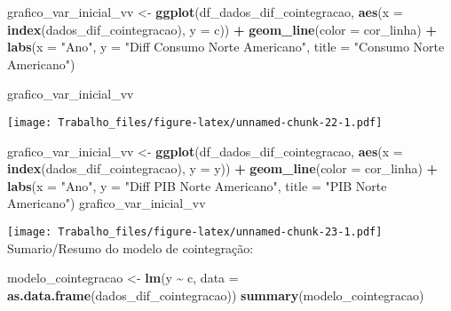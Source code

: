 \documentclass[
]{article}
\newenvironment{Shaded}{\begin{snugshade}}{\end{snugshade}}
\newcommand{\AttributeTok}[1]{\textcolor[rgb]{0.13,0.29,0.53}{#1}}
\newcommand{\FunctionTok}[1]{\textcolor[rgb]{0.13,0.29,0.53}{\textbf{#1}}}
\newcommand{\NormalTok}[1]{#1}
\newcommand{\OtherTok}[1]{\textcolor[rgb]{0.56,0.35,0.01}{#1}}
\newcommand{\SpecialCharTok}[1]{\textcolor[rgb]{0.81,0.36,0.00}{\textbf{#1}}}
\newcommand{\StringTok}[1]{\textcolor[rgb]{0.31,0.60,0.02}{#1}}
\begin{document}
\begin{Shaded}
\begin{Highlighting}[]
\NormalTok{grafico\_var\_inicial\_vv }\OtherTok{\textless{}{-}} \FunctionTok{ggplot}\NormalTok{(df\_dados\_dif\_cointegracao, }\FunctionTok{aes}\NormalTok{(}\AttributeTok{x =} \FunctionTok{index}\NormalTok{(dados\_dif\_cointegracao), }\AttributeTok{y =}\NormalTok{ c)) }\SpecialCharTok{+}
  \FunctionTok{geom\_line}\NormalTok{(}\AttributeTok{color =}\NormalTok{ cor\_linha) }\SpecialCharTok{+}
  \FunctionTok{labs}\NormalTok{(}\AttributeTok{x =} \StringTok{"Ano"}\NormalTok{, }\AttributeTok{y =} \StringTok{"Diff Consumo Norte Americano"}\NormalTok{, }\AttributeTok{title =} \StringTok{"Consumo Norte Americano"}\NormalTok{)}

\NormalTok{grafico\_var\_inicial\_vv}
\end{Highlighting}
\end{Shaded}

\texttt{[image: Trabalho\_files/figure-latex/unnamed-chunk-22-1.pdf]}

\begin{Shaded}
\begin{Highlighting}[]
\NormalTok{grafico\_var\_inicial\_vv }\OtherTok{\textless{}{-}} \FunctionTok{ggplot}\NormalTok{(df\_dados\_dif\_cointegracao, }\FunctionTok{aes}\NormalTok{(}\AttributeTok{x =} \FunctionTok{index}\NormalTok{(dados\_dif\_cointegracao), }\AttributeTok{y =}\NormalTok{ y)) }\SpecialCharTok{+}
  \FunctionTok{geom\_line}\NormalTok{(}\AttributeTok{color =}\NormalTok{ cor\_linha) }\SpecialCharTok{+}
  \FunctionTok{labs}\NormalTok{(}\AttributeTok{x =} \StringTok{"Ano"}\NormalTok{, }\AttributeTok{y =} \StringTok{"Diff PIB Norte Americano"}\NormalTok{, }\AttributeTok{title =} \StringTok{"PIB Norte Americano"}\NormalTok{)}
\NormalTok{grafico\_var\_inicial\_vv}
\end{Highlighting}
\end{Shaded}

\texttt{[image: Trabalho\_files/figure-latex/unnamed-chunk-23-1.pdf]}
Sumario/Resumo do modelo de cointegração:

\begin{Shaded}
\begin{Highlighting}[]
\NormalTok{modelo\_cointegracao }\OtherTok{\textless{}{-}} \FunctionTok{lm}\NormalTok{(y }\SpecialCharTok{\textasciitilde{}}\NormalTok{ c, }\AttributeTok{data =} \FunctionTok{as.data.frame}\NormalTok{(dados\_dif\_cointegracao))}
\FunctionTok{summary}\NormalTok{(modelo\_cointegracao)}
\end{Highlighting}
\end{Shaded}
\end{document}
